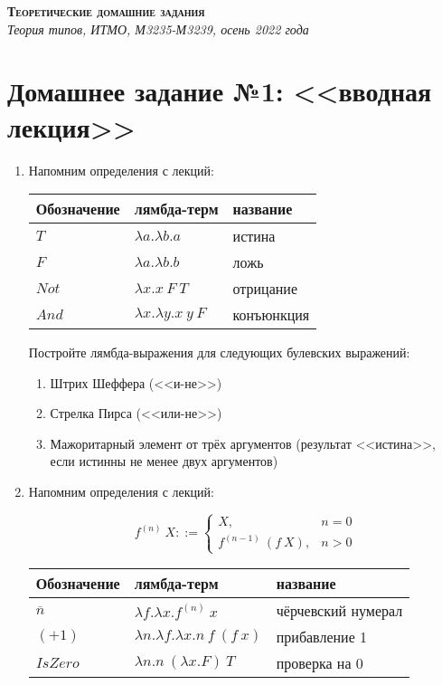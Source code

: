 \documentclass[10pt,a4paper,oneside]{article}
\begin{document}
\begin{center}{\Large\textsc{\textbf{Теоретические домашние задания}}}\\
             \it Теория типов, ИТМО, М3235-М3239, осень 2022 года\end{center}

\section*{Домашнее задание №1: <<вводная лекция>>}

\begin{enumerate}

\item Напомним определения с лекций:

\begin{tabular}{lll}
Обозначение & лямбда-терм & название\\\hline
$T$ & $\lambda a.\lambda b.a$ & истина\\
$F$ & $\lambda a.\lambda b.b$ & ложь\\
$Not$ & $\lambda x.x\ F\ T$ & отрицание\\
$And$ & $\lambda x.\lambda y.x\ y\ F$ & конъюнкция
\end{tabular}

Постройте лямбда-выражения для следующих булевских выражений:
\begin{enumerate}
\item Штрих Шеффера (<<и-не>>)
\item Стрелка Пирса (<<или-не>>)
\item Мажоритарный элемент от трёх аргументов (результат <<истина>>, если истинны не менее двух аргументов)
\end{enumerate}

\item Напомним определения с лекций:

$$f^{(n)}\ X ::= \left\{\begin{array}{ll} X, & n=0\\
                                f^{(n-1)}\ (f\ X), & n>0\end{array}\right.$$

\begin{center}\begin{tabular}{lll}
Обозначение & лямбда-терм & название\\\hline
$\overline{n}$ & $\lambda f.\lambda x.f^{(n)}\ x$ & чёрчевский нумерал\\
$(+1)$ & $\lambda n.\lambda f.\lambda x.n\ f\ (f\ x)$ & прибавление 1\\
$IsZero$ & $\lambda n.n\ (\lambda x.F)\ T$ & проверка на 0
\end{tabular}\end{center}


\end{enumerate}
\end{document}
